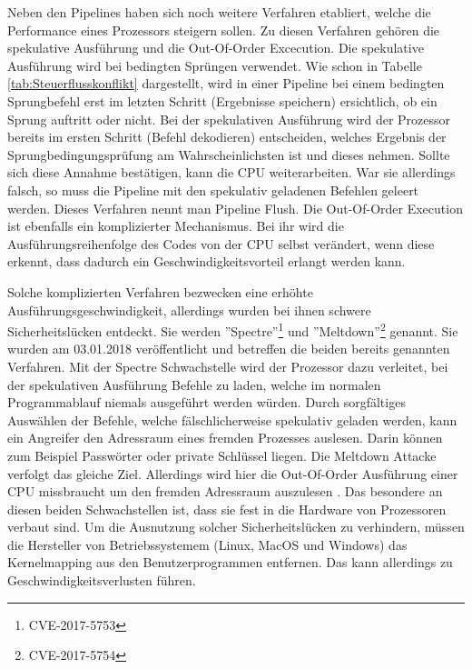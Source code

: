 \documentclass[a4paper,12pt]{article}
\begin{document}
\par\bigskip\noindent Neben den Pipelines haben sich noch weitere Verfahren etabliert, welche die Performance eines Prozessors steigern sollen. Zu diesen Verfahren gehören die spekulative Ausführung und die Out-Of-Order Excecution. Die spekulative Ausführung wird bei bedingten Sprüngen verwendet. Wie schon in Tabelle \ref{tab:Steuerflusskonflikt} dargestellt, wird in einer Pipeline bei einem bedingten Sprungbefehl erst im letzten Schritt (Ergebnisse speichern) ersichtlich, ob ein Sprung auftritt oder nicht. Bei der spekulativen Ausführung wird der Prozessor bereits im ersten Schritt (Befehl dekodieren) entscheiden, welches Ergebnis der Sprungbedingungsprüfung am Wahrscheinlichsten ist und dieses nehmen. Sollte sich diese Annahme bestätigen, kann die CPU weiterarbeiten. War sie allerdings falsch, so muss die Pipeline mit den spekulativ geladenen Befehlen geleert werden. Dieses Verfahren nennt man Pipeline Flush. \cite{mikroprozessortechnik2011} \newpage\noindent Die Out-Of-Order Execution ist ebenfalls ein komplizierter Mechanismus. Bei ihr wird die Ausführungsreihenfolge des Codes von der CPU selbst verändert, wenn diese erkennt, dass dadurch ein Geschwindigkeitsvorteil erlangt werden kann. 

\par\bigskip\noindent Solche komplizierten Verfahren bezwecken eine erhöhte Ausführungsgeschwindigkeit, allerdings wurden bei ihnen schwere Sicherheitslücken entdeckt. Sie werden ''Spectre''\footnote{CVE-2017-5753} und ''Meltdown''\footnote{CVE-2017-5754} genannt. Sie wurden am 03.01.2018 veröffentlicht und betreffen die beiden bereits genannten Verfahren. Mit der Spectre Schwachstelle wird der Prozessor dazu verleitet, bei der spekulativen Ausführung Befehle zu laden, welche im normalen Programmablauf niemals ausgeführt werden würden. Durch sorgfältiges Auswählen der Befehle, welche fälschlicherweise spekulativ geladen werden, kann ein Angreifer den Adressraum eines fremden Prozesses auslesen. Darin können zum Beispiel Passwörter oder private Schlüssel liegen\cite{spectre}. Die Meltdown Attacke verfolgt das gleiche Ziel. Allerdings wird hier die Out-Of-Order Ausführung einer CPU missbraucht um den fremden Adressraum auszulesen \cite{meltdown}. Das besondere an diesen beiden Schwachstellen ist, dass sie fest in die Hardware von Prozessoren verbaut sind. Um die Ausnutzung solcher Sicherheitslücken zu verhindern, müssen die Hersteller von Betriebssystemem (Linux, MacOS und Windows) das Kernelmapping aus den Benutzerprogrammen entfernen. Das kann allerdings zu Geschwindigkeitsverlusten führen.
\end{document}
